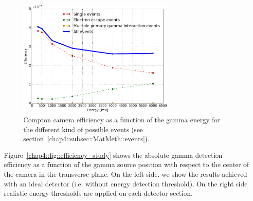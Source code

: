 \begin{figure} [!hbtp]	
\centering
\includegraphics[width=0.7\textwidth]{03_GraphicFiles/chapter4_HTsimu/new/effVSenergy_trigger.png}
\caption{Compton camera efficiency as a function of the gamma energy for the different kind of possible events (see section~\ref{chap4::subsec::MatMeth::events}).}
\label{chap4::fig::eff_evKind}
\end{figure}

Figure~\ref{chap4::fig::efficiency_study} shows the absolute gamma detection efficiency as a function of the gamma source position with respect to the center of the camera in the transverse plane. On the left side, we show the results achieved with an ideal detector (i.e. without energy detection threshold). On the right side realistic energy thresholds are applied on each detector section.

